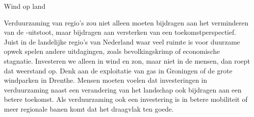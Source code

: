 \begin{voorstel}{Wind op land}
\begin{multicols}{2}
\begin{aanbevelingen-end}
Verduurzaming van regio’s zou niet alleen moeten bijdragen aan het verminderen van de \COO-uitstoot, maar bijdragen aan versterken van een toekomstperspectief. Juist in de landelijke regio’s van Nederland waar veel ruimte is voor duurzame opwek spelen andere uitdagingen, zoals bevolkingskrimp of economische stagnatie. Investeren we alleen in wind en zon, maar niet in de mensen, dan roept dat weerstand op. Denk aan de exploitatie van gas in Groningen of de grote windparken in Drenthe. Mensen moeten voelen dat investeringen in verduurzaming naast een verandering van het landschap ook bijdragen aan een betere toekomst. Als verduurzaming ook een investering is in betere mobiliteit of meer regionale banen komt dat het draagvlak ten goede.

\end{aanbevelingen-end}

\end{multicols}

\end{voorstel}
